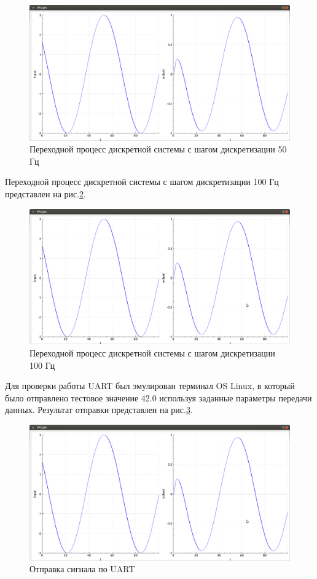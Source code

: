 \documentclass[14pt,a4paper]{extreport}
\begin{document}
\begin{figure}[H]
    \centering
    \includegraphics[width=160mm]{img/50hz.png}
    \caption{Переходной процесс дискретной системы 
    с шагом дискретизации 50 Гц}
    \label{fig:discrete50}
\end{figure}

Переходной процесс дискретной системы с шагом дискретизации 
100 Гц представлен на рис.\ref{fig:discrete100}.

\begin{figure}[H]
    \centering
    \includegraphics[width=160mm]{img/100hz.png}
    \caption{Переходной процесс дискретной системы 
    с шагом дискретизации 100 Гц}
    \label{fig:discrete100}
\end{figure}

Для проверки работы UART был эмулирован терминал OS Linux, в который было отправлено тестовое значение 
42.0 используя заданные параметры передачи данных. 
Результат отправки представлен на рис.\ref{fig:uart}.
\begin{figure}[H]
    \centering
    \includegraphics[width=160mm]{img/100hz.png}
    \caption{Отправка сигнала по UART}
    \label{fig:uart}
\end{figure}
\end{document}
